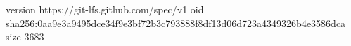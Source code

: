 version https://git-lfs.github.com/spec/v1
oid sha256:0aa9e3a9495dce34f9e3bf72b3c793888f8df13d06d723a4349326b4e3586dca
size 3683
